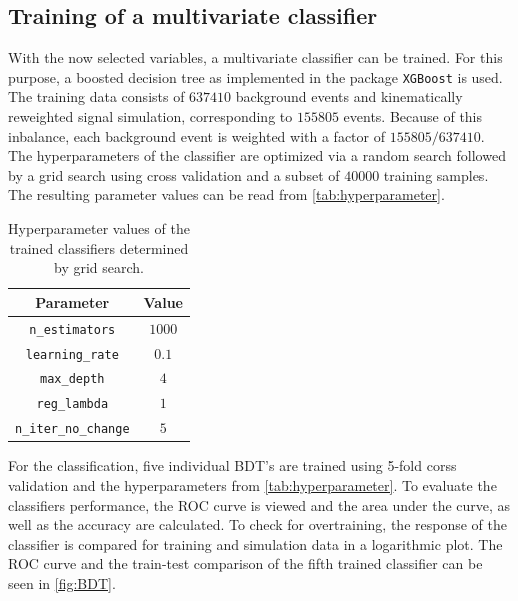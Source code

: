 \subsection{Training of a multivariate classifier}
With the now selected variables, a multivariate classifier can be trained. For this purpose, a boosted decision tree as implemented in the package \texttt{XGBoost} \cite{XGBoost}
is used. The training data consists of $\num{637410}$ background events and kinematically reweighted signal simulation, corresponding to $\num{155805}$ events. Because of this 
inbalance, each background event is weighted with a factor of $155805/637410$.
The hyperparameters of the classifier are optimized via a random search followed by a grid search using cross validation and a subset of $\num{40000}$ training samples. 
The resulting parameter values can be read from \autoref{tab:hyperparameter}.
\begin{table}[h!]
  \centering
  \caption{Hyperparameter values of the trained classifiers determined by grid search.}
  \label{tab:hyperparameter}
  \begin{tabular}{c | c}
    \hline
    {Parameter} & {Value} \\
    \hline
    \texttt{n\_estimators} & {$\num{1000}$} \\
    \texttt{learning\_rate} & {$\num{0.1}$} \\
    \texttt{max\_depth} & {$\num{4}$} \\
    \texttt{reg\_lambda} & {$\num{1}$} \\
    \texttt{n\_iter\_no\_change} & {$\num{5}$} \\
    \hline   
  \end{tabular}
\end{table}
For the classification, five individual BDT's are trained using 5-fold corss validation and the hyperparameters from \autoref{tab:hyperparameter}.
To evaluate the classifiers performance, the ROC curve is viewed and the area under the curve, as well as the accuracy are calculated. 
To check for overtraining, the response of the classifier is compared for training and simulation data in a logarithmic plot.
The ROC curve and the train-test comparison of the fifth trained classifier can be seen in \autoref{fig:BDT}.
